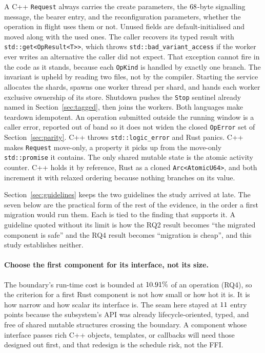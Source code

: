 \documentclass[english,oneside,a4paper,censored,csm,software-track-2020]{HYthesisML}
\begin{document}
\begin{appendices}
A C++ \texttt{Request} always carries the create parameters, the $68$-byte
signalling message, the bearer entry, and the reconfiguration parameters, whether the operation
in flight uses them or not. Unused fields are default-initialised and moved along with the used
ones. The caller recovers its typed result with \texttt{std::get<OpResult<T>>}, which throws
\texttt{std::bad\_variant\_access} if the worker ever writes an alternative the caller did not
expect. That exception cannot fire in the code as it stands, because each \texttt{OpKind} is
handled by exactly one branch. The invariant is upheld by reading two files, not by the
compiler. Starting the service allocates the shards, spawns one worker thread per shard, and
hands each worker exclusive ownership of its store. Shutdown pushes the \texttt{Stop} sentinel
already named in Section~\ref{sec:tagged}, then joins the workers. Both languages make teardown
idempotent. An operation submitted outside the running window is a caller error, reported out of
band so it does not widen the closed \texttt{OpError} set of Section~\ref{sec:parity}. C++ throws
\texttt{std::logic\_error} and Rust panics. C++ makes \texttt{Request} move-only, a property it
picks up from the move-only \texttt{std::promise} it contains. The only shared mutable state is
the atomic activity counter. C++ holds it by reference, Rust as a cloned
\texttt{Arc<AtomicU64>}, and both increment it with relaxed ordering because nothing branches on
its value.

Section~\ref{sec:guidelines} keeps the two guidelines the study arrived at late. The seven
below are the practical form of the rest of the evidence, in the order a first migration would
run them. Each is tied to the finding that supports it. A guideline quoted without its limit is
how the RQ2 result becomes ``the migrated component is safe'' and the RQ4 result becomes
``migration is cheap'', and this study establishes neither.

\paragraph{Choose the first component for its interface, not its size.}
The boundary's run-time cost is bounded at $10.91\%$ of an operation (RQ4), so the
criterion for a first Rust component is not how small or how hot it is. It is how narrow and
how scalar its interface is. The seam here stayed at $11$ entry points because the
subsystem's API was already lifecycle-oriented, typed, and free of shared mutable structures
crossing the boundary. A component whose interface passes rich C++ objects, templates, or
callbacks will need those designed out first, and that redesign is the schedule risk, not the
FFI.


\end{appendices}
\end{document}
